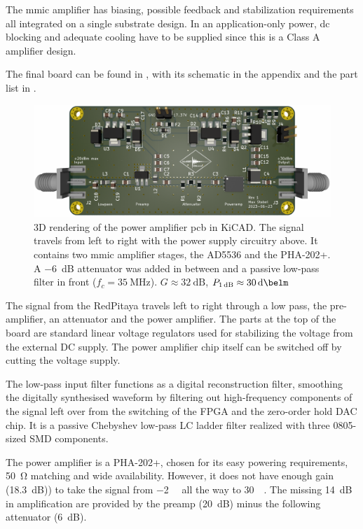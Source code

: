 The \acrfull{mmic} amplifier has biasing, possible feedback and stabilization requirements all integrated on a single substrate design. In an application-only power, \acrshort{dc} blocking and adequate cooling have to be supplied since this is a Class A amplifier design.

The final board can be found in , with its schematic in the appendix  and the part list in .

\begin{figure}[hbt]
    \centering
    \includegraphics{images/poweramp.png}
    \caption{ 3D rendering of the power amplifier \acrshort{pcb} in KiCAD. The signal travels from left to right with the power supply circuitry above. It contains two \acrshort{mmic} amplifier stages, the AD5536 and the PHA-202+. A \qty{-6}{\deci\bel} attenuator was added in between and a passive low-pass filter in front (\(f_c = \qty{35}{\mega\hertz}\)). \(G \approx \qty{32}{\deci\bel}\), \(P_{\qty{1}{\deci\bel}} \approx \qty{+30}{\deci\belm}\)}
\end{figure}

The signal from the RedPitaya travels left to right through a low pass, the pre-amplifier, an attenuator and the power amplifier. The parts at the top of the board are standard linear voltage regulators used for stabilizing the voltage from the external DC supply. The power amplifier chip itself can be switched off by cutting the voltage supply.

The low-pass input filter functions as a digital reconstruction filter, smoothing the digitally synthesised waveform by filtering out high-frequency components of the signal left over from the switching of the FPGA and the zero-order hold DAC chip. It is a passive Chebyshev low-pass LC ladder filter realized with three 0805-sized SMD components.

The power amplifier is a PHA-202+, chosen for its easy powering requirements, \qty{50}{\ohm} matching and wide availability. However, it does not have enough gain (\qty{18.3}{\deci\bel})) to take the signal from \qty{-2}{\deci\belm} all the way to \qty{+30}{\deci\belm}. The missing \qty{14}{\deci\bel} in amplification are provided by the preamp (\qty{20}{\deci\bel}) minus the following attenuator (\qty{6}{\deci\bel}).

